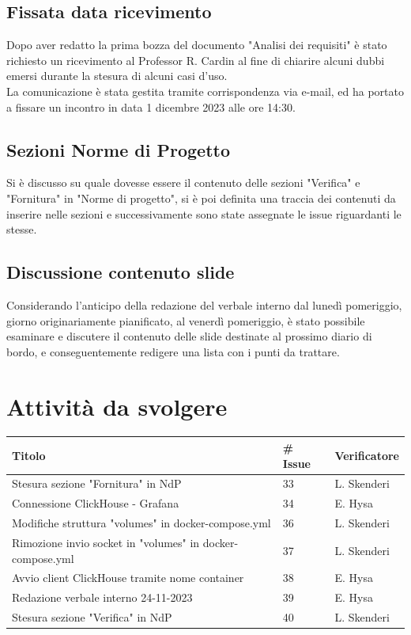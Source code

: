 \documentclass{article}
\begin{document}
    \subsection{Fissata data ricevimento}
        Dopo aver redatto la prima bozza del documento "Analisi dei requisiti" è stato richiesto un ricevimento al Professor R. Cardin al fine di chiarire alcuni dubbi emersi durante la stesura di alcuni casi d'uso. \\
        La comunicazione è stata gestita tramite corrispondenza via e-mail, ed ha portato a fissare un incontro in data 1 dicembre 2023 alle ore 14:30.

    \subsection{Sezioni Norme di Progetto}
        Si è discusso su quale dovesse essere il contenuto delle sezioni "Verifica" e "Fornitura" in "Norme di progetto", si è poi definita una traccia dei contenuti da inserire nelle sezioni e successivamente sono state assegnate le issue riguardanti le stesse.
    
    \subsection{Discussione contenuto slide}
        Considerando l'anticipo della redazione del verbale interno dal lunedì pomeriggio, giorno originariamente pianificato, al venerdì pomeriggio, è stato possibile esaminare e discutere il contenuto delle slide destinate al prossimo diario di bordo, e conseguentemente redigere una lista con i punti da trattare.
        
\section{Attività da svolgere}
    \begin{center}
        \begin{tabular}{|C{7cm}|C{1,5cm}|C{3cm}|}
            \hline
            \textbf{Titolo} & \textbf{\# Issue} & \textbf{Verificatore} \\
            \hline\hline
            Stesura sezione "Fornitura" in NdP & 33 & L. Skenderi \\
            \hline
            Connessione ClickHouse - Grafana & 34 & E. Hysa \\
            \hline
            Modifiche struttura "volumes" in docker-compose.yml & 36 & L. Skenderi \\
            \hline
            Rimozione invio socket in "volumes" in docker-compose.yml & 37 & L. Skenderi \\
            \hline
            Avvio client ClickHouse tramite nome container & 38 & E. Hysa \\
            \hline
            Redazione verbale interno 24-11-2023 & 39 & E. Hysa \\
            \hline
            Stesura sezione "Verifica" in NdP & 40 & L. Skenderi \\
            \hline
        \end{tabular}
    \end{center}
\end{document}
